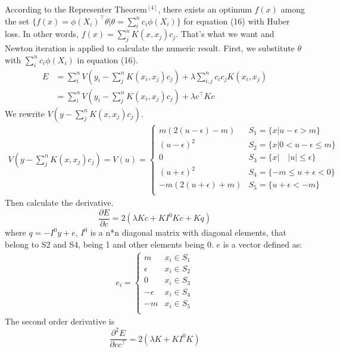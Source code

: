 \documentclass[11pt, oneside]{article}   	%
\begin{document}
According to the Representer Theorem$^{[4]}$, there exists an optimum $f(x)$ among the set $\{ f(x) = \phi(X_i)^{\top}\theta | \theta = \sum_i^n  c_i\phi(X_i)\}$ for equation (16) with Huber loss.  In other words, $f(x) = \sum_j^nK(x, x_j)c_j$.  That's what we want and Newton iteration is applied to calculate the numeric result.  First, we substitute $\theta$ with $\sum_i^n  c_i\phi(X_i)$ in equation (16).
\begin{equation}
\begin{split}
E &= \sum_i^n V(y_i - \sum_j^n K(x_i, x_j)c_j) + \lambda \sum_{i,j}^n c_ic_jK(x_i, x_j)\\
 &=  \sum_i^n V(y_i - \sum_j^n K(x_i, x_j)c_j) + \lambda c^\top K c
\end{split}
\end{equation}
We rewrite $V(y - \sum_j^n K(x, x_j)c_j)$.
\begin{align}
V(y - \sum_j^n K(x, x_j)c_j) = V(u) =
\begin{cases}
m(2(u - \epsilon) - m) & S_1 = \{ x|u - \epsilon > m\} \\
(u-\epsilon)^2 & S_2 = \{ x|0 < u-\epsilon \leq m\}\\
0 & S_3 = \{ x | \quad|u| \leq \epsilon\} \\
(u+\epsilon)^2 & S_4 =\{ -m \le u + \epsilon < 0\}\\
-m(2(u + \epsilon) + m) & S_5 =\{ u + \epsilon < -m\}\\
\end{cases}
\end{align}
Then calculate the derivative.
\begin{equation}
\frac{\partial E}{\partial c} = 2(\lambda K c + K I^0Kc + Kq)
\end{equation}
where $q=-I^0y +e$, $I^0$ is a n*n diagonal matrix with diagonal elements, that belong to S2 and S4, being 1 and other elements being 0. $e$ is a vector defined as:
\begin{align}
e_i =
\begin{cases}
m & x_i \in S_1 \\
\epsilon & x_i \in S_2 \\
0 & x_i \in S_3 \\
-\epsilon & x_i \in S_4 \\
-m & x_i \in S_5 \\
\end{cases}
\end{align}
The second order derivative is
\begin{equation}
\frac{\partial^2E}{\partial c c^\top} = 2(\lambda K + K I^0 K )
\end{equation}
\end{document}

